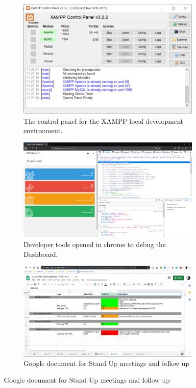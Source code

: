 \begin{figure}[H]
\begin{figure}[H]
\center
\includegraphics[scale=0.5]{images/XAMPP_cp.png}
\caption{The control panel for the XAMPP local development environment.}
\end{figure}

\begin{figure}[H]
\center
\includegraphics[scale=0.3]{images/dev_tools.png}
\caption{Developer tools opened in chrome to debug the Dashboard.}
\end{figure}

\begin{figure}[H]
\center
\includegraphics[scale=0.3]{images/docs.png}
\caption{Google document for Stand Up meetings and follow up}
\end{figure}


\end{figure}
